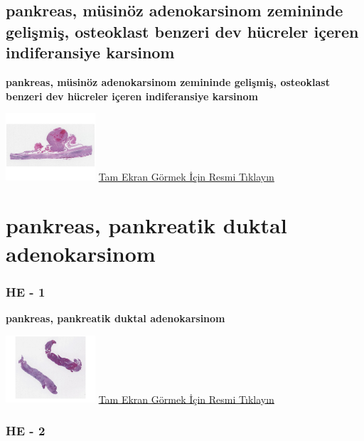 \documentclass[
  letterpaper,
  DIV=11,
  numbers=noendperiod]{scrreprt}
\begin{document}
\hypertarget{sec-pankreas-musinous-adenokarsinom-osteoklast}{%
\section{pankreas, müsinöz adenokarsinom zemininde gelişmiş, osteoklast
benzeri dev hücreler içeren indiferansiye
karsinom}\label{sec-pankreas-musinous-adenokarsinom-osteoklast}}

\textbf{pankreas, müsinöz adenokarsinom zemininde gelişmiş, osteoklast
benzeri dev hücreler içeren indiferansiye karsinom}

\href{https://images.patolojiatlasi.com/pancreas-undifferentiated-osteoclast/HE.html}{\includegraphics[width=0.25\textwidth,height=\textheight]{./screenshots/thumbnail_pancreas-undifferentiated-osteoclast.png}}
\href{https://images.patolojiatlasi.com/pancreas-undifferentiated-osteoclast/HE.html}{Tam
Ekran Görmek İçin Resmi Tıklayın}

\hypertarget{sec-PDAC-tru-cut}{%
\chapter{pankreas, pankreatik duktal
adenokarsinom}\label{sec-PDAC-tru-cut}}

\hypertarget{he---1-2}{%
\subsection{HE - 1}\label{he---1-2}}

\textbf{pankreas, pankreatik duktal adenokarsinom}

\href{https://images.patolojiatlasi.com/PDAC-tru-cut/HE1.html}{\includegraphics[width=0.25\textwidth,height=\textheight]{./screenshots/thumbnail_PDAC-tru-cut-1.png}}
\href{https://images.patolojiatlasi.com/PDAC-tru-cut/HE1.html}{Tam Ekran
Görmek İçin Resmi Tıklayın}

\hypertarget{he---2-2}{%
\subsection{HE - 2}\label{he---2-2}}
\end{document}
